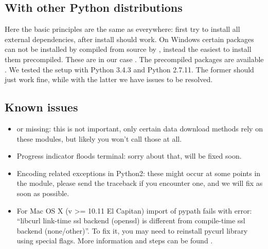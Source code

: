 \documentclass[letterpaper,10pt,english]{sphinxmanual}
\begin{document}
\subsection{With other Python distributions}
\label{\detokenize{index:with-other-python-distributions}}
Here the basic principles are the same as everywhere: first try to install all
external dependencies, after  install should work. On Windows certain
packages can not be installed by compiled from source by , instead the
easiest to install them precompiled. These are in our case . The
precompiled packages are available .
We tested the setup with Python 3.4.3 and Python 2.7.11. The former should just
work fine, while with the latter we have issues to be resolved.


\subsection{Known issues}
\label{\detokenize{index:known-issues}}\begin{itemize}
\item {} 
 \textendash{} or  missing: this is not
important, only certain data download methods rely on these modules, but
likely you won’t call those at all.

\item {} 
Progress indicator floods terminal: sorry about that, will be fixed soon.

\item {} 
Encoding related exceptions in Python2: these might occur at some points in
the module, please send the traceback if you encounter one, and we will fix
as soon as possible.

\item {} 
For Mac OS X (v \textgreater{}= 10.11 El Capitan) import of pypath fails with error:
“libcurl link-time ssl backend (openssl) is different from compile-time ssl
backend (none/other)”. To fix it, you may need to reinstall pycurl library
using special flags. More information and steps can be found
.

\end{itemize}

\end{document}
